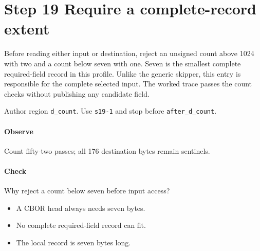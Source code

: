 \section{Step 19 Require a complete-record extent}\label{cbor-s19}
Before reading either input or destination, reject an unsigned count above 1024 with two and a count below seven with one. Seven is the smallest complete required-field record in this profile. Unlike the generic skipper, this entry is responsible for the complete selected input. The worked trace passes the count checks without publishing any candidate field.

Author region \texttt{d\_count}. Use \texttt{s19-1} and stop before \texttt{after\_d\_count}.

\paragraph{Observe} Count fifty-two passes; all 176 destination bytes remain sentinels.

\paragraph{Check} Why reject a count below seven before input access?
\begin{itemize}
\item[A.] A CBOR head always needs seven bytes.
\item[B.] No complete required-field record can fit.
\item[C.] The local record is seven bytes long.
\end{itemize}
